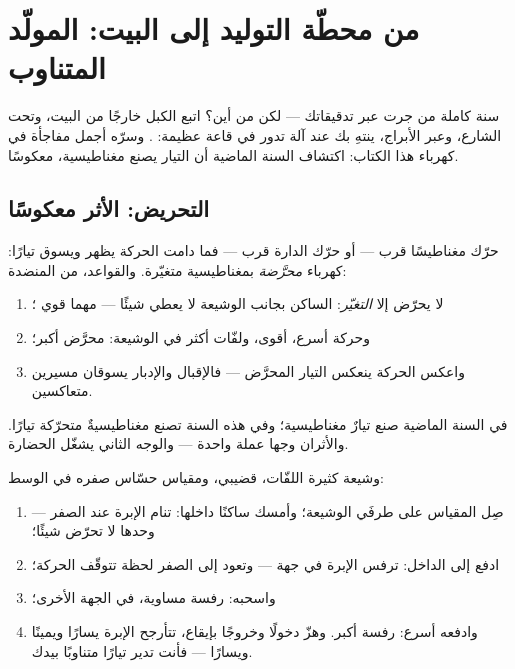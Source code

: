 \chapter{من محطّة التوليد إلى البيت: المولّد المتناوب}\label{ch:g9:alternator}

سنة كاملة من  جرت عبر تدقيقاتك --- لكن من أين؟
اتبع الكبل خارجًا من البيت، وتحت الشارع، وعبر الأبراج، ينتهِ
بك عند آلة تدور في قاعة عظيمة: . وسرّه أجمل
مفاجأة في كهرباء هذا الكتاب: اكتشاف السنة الماضية أن التيار
يصنع مغناطيسية، معكوسًا.

\section{التحريض: الأثر معكوسًا}

\begin{proposition}\label{prop:g9:alternator:induction}
حرّك مغناطيسًا قرب  --- أو حرّك الدارة قرب 
--- فما دامت الحركة يظهر  ويسوق تيارًا: كهرباء
\emph{محرَّضة} بمغناطيسية متغيّرة. والقواعد، من المنضدة:
\begin{enumerate}
  \item لا يحرّض إلا \emph{التغيّر}:  الساكن بجانب
        الوشيعة لا يعطي شيئًا --- مهما قوي ؛
  \item وحركة أسرع،  أقوى، ولفّات أكثر في الوشيعة:
         محرَّض أكبر؛
  \item واعكس الحركة ينعكس التيار المحرَّض --- فالإقبال
        والإدبار يسوقان مسيرين متعاكسين.
\end{enumerate}
في السنة الماضية صنع تيارٌ مغناطيسية؛ وفي هذه السنة تصنع
مغناطيسيةٌ متحرّكة تيارًا. والأثران وجها عملة واحدة --- والوجه
الثاني يشغّل الحضارة.
\end{proposition}

\begin{method}\label{met:g9:alternator:bench}
وشيعة كثيرة اللفّات،  قضيبي، ومقياس حسّاس صفره في
الوسط:
\begin{enumerate}
  \item صِل المقياس على طرفَي الوشيعة؛ وأمسك  ساكنًا
        داخلها: تنام الإبرة عند الصفر ---  وحدها لا
        تحرّض شيئًا؛
  \item ادفع  إلى الداخل: ترفس الإبرة في جهة ---
        وتعود إلى الصفر لحظة تتوقّف الحركة؛
  \item واسحبه: رفسة مساوية، في الجهة الأخرى؛
  \item وادفعه أسرع: رفسة أكبر. وهزّ  دخولًا وخروجًا
        بإيقاع، تتأرجح الإبرة يسارًا ويمينًا ويسارًا --- فأنت
        تدير تيارًا متناوبًا بيدك.
\end{enumerate}
\end{method}

